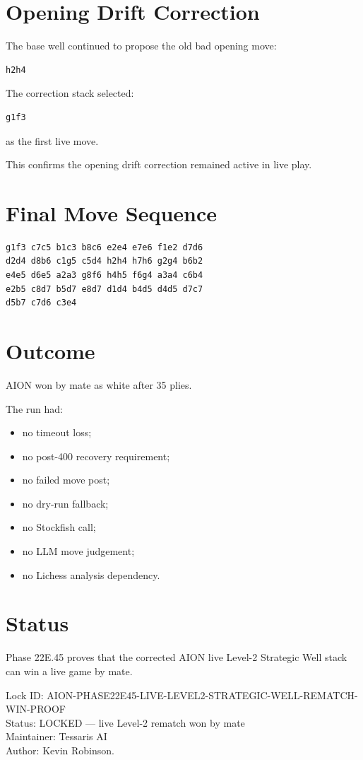 \documentclass[11pt,a4paper]{article}
\begin{document}
\section{Opening Drift Correction}

The base well continued to propose the old bad opening move:

\begin{verbatim}
h2h4
\end{verbatim}

The correction stack selected:

\begin{verbatim}
g1f3
\end{verbatim}

as the first live move.

This confirms the opening drift correction remained active in live play.

\section{Final Move Sequence}

\begin{verbatim}
g1f3 c7c5 b1c3 b8c6 e2e4 e7e6 f1e2 d7d6
d2d4 d8b6 c1g5 c5d4 h2h4 h7h6 g2g4 b6b2
e4e5 d6e5 a2a3 g8f6 h4h5 f6g4 a3a4 c6b4
e2b5 c8d7 b5d7 e8d7 d1d4 b4d5 d4d5 d7c7
d5b7 c7d6 c3e4
\end{verbatim}

\section{Outcome}

AION won by mate as white after 35 plies.

The run had:

\begin{itemize}
  \item no timeout loss;
  \item no post-400 recovery requirement;
  \item no failed move post;
  \item no dry-run fallback;
  \item no Stockfish call;
  \item no LLM move judgement;
  \item no Lichess analysis dependency.
\end{itemize}

\section{Status}

Phase 22E.45 proves that the corrected AION live Level-2 Strategic Well stack can win a live game by mate.

\bigskip

\noindent
Lock ID: AION-PHASE22E45-LIVE-LEVEL2-STRATEGIC-WELL-REMATCH-WIN-PROOF\\
Status: LOCKED --- live Level-2 rematch won by mate\\
Maintainer: Tessaris AI\\
Author: Kevin Robinson.
\end{document}

